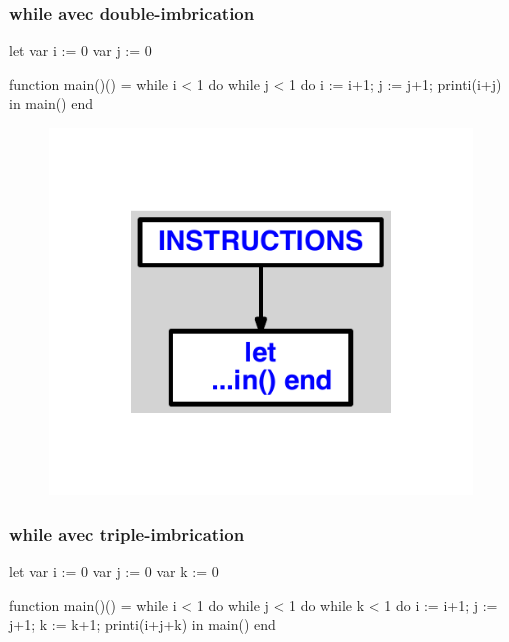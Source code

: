 \documentclass{article}
\begin{document}
\subsubsection{while avec double-imbrication}
\begin{verbatimtab}
let
	var i := 0
	var j := 0

	function main()() =
		while i < 1 do
			while j < 1 do
				i := i+1;
				j := j+1;
				printi(i+j)
in main() end
\end{verbatimtab}
\begin{figure}[H]\centering\includegraphics[max width=\textwidth]{ast/ast_327.pdf}\end{figure}\subsubsection{while avec triple-imbrication}
\begin{verbatimtab}
let
	var i := 0
	var j := 0
	var k := 0

	function main()() =
		while i < 1 do
			while j < 1 do
				while k < 1 do
					i := i+1;
					j := j+1;
					k := k+1;
					printi(i+j+k)
in main() end
\end{verbatimtab}
\end{document}
